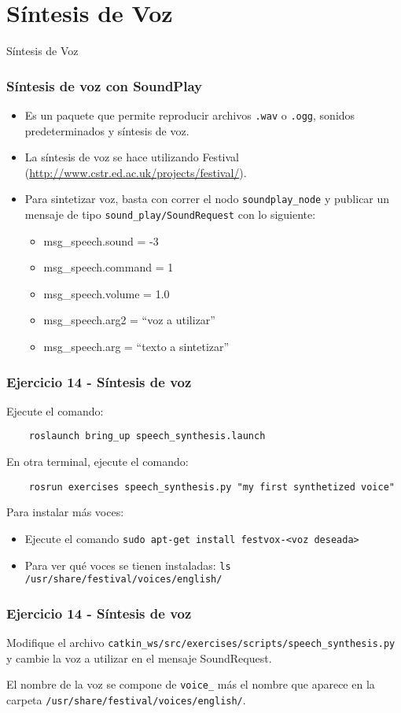 \section{Síntesis de Voz}

\begin{frame}
  \Huge
  Síntesis de Voz
\end{frame}

\begin{frame}\frametitle{Síntesis de voz con SoundPlay}
  \begin{itemize}
  \item Es un paquete que permite reproducir archivos \texttt{.wav} o \texttt{.ogg}, sonidos predeterminados y síntesis de voz.
  \item La síntesis de voz se hace utilizando Festival (\url{http://www.cstr.ed.ac.uk/projects/festival/}).
  \item Para sintetizar voz, basta con correr el nodo \texttt{soundplay\_node} y publicar un mensaje de tipo \texttt{sound\_play/SoundRequest} con lo siguiente:
    \begin{itemize}
    \item msg\_speech.sound   = -3                 
    \item msg\_speech.command = 1                  
    \item msg\_speech.volume  = 1.0                
    \item msg\_speech.arg2    = ``voz a utilizar''
    \item msg\_speech.arg = ``texto a sintetizar''
    \end{itemize}
  \end{itemize}
\end{frame}

\begin{frame}[containsverbatim]\frametitle{Ejercicio 14 - Síntesis de voz}
  Ejecute el comando:
  \begin{lstlisting}
    roslaunch bring_up speech_synthesis.launch
  \end{lstlisting}
  En otra terminal, ejecute el comando:
  \begin{lstlisting}
    rosrun exercises speech_synthesis.py "my first synthetized voice"
  \end{lstlisting}
  Para instalar más voces:
  \begin{itemize}
  \item Ejecute el comando \texttt{sudo apt-get install festvox-<voz deseada>}
  \item Para ver qué voces se tienen instaladas: \texttt{ls /usr/share/festival/voices/english/}
  \end{itemize}
\end{frame}

\begin{frame}[containsverbatim]\frametitle{Ejercicio 14 - Síntesis de voz}
  Modifique el archivo \texttt{catkin\_ws/src/exercises/scripts/speech\_synthesis.py} y cambie la voz a utilizar en el mensaje SoundRequest.
  
  El nombre de la voz se compone de \texttt{voice\_} más el nombre que aparece en la carpeta \texttt{/usr/share/festival/voices/english/}. 
\end{frame}

